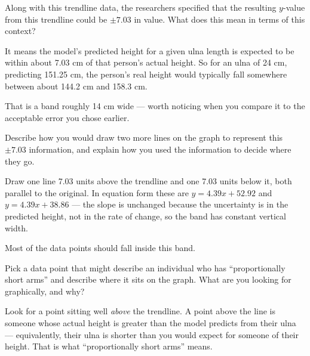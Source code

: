 \documentclass[12pt]{ximera}
\begin{document}
\begin{problem}
Along with this trendline data, the researchers specified that the resulting $y$-value
from this trendline could be $\pm 7.03$ in value. What does this mean in terms of this
context?

\begin{freeResponse}
\end{freeResponse}

\begin{solution}
It means the model's predicted height for a given ulna length is expected to be within
about 7.03 cm of that person's actual height. So for an ulna of 24 cm, predicting
151.25 cm, the person's real height would typically fall somewhere between about 144.2
cm and 158.3 cm.

That is a band roughly 14 cm wide --- worth noticing when you compare it to the
acceptable error you chose earlier.
\end{solution}
\end{problem}

\begin{problem}
Describe how you would draw two more lines on the graph to represent this $\pm 7.03$
information, and explain how you used the information to decide where they go.

\begin{freeResponse}
\end{freeResponse}

\begin{solution}
Draw one line 7.03 units above the trendline and one 7.03 units below it, both parallel
to the original. In equation form these are $y = 4.39x + 52.92$ and
$y = 4.39x + 38.86$ --- the slope is unchanged because the uncertainty is in the
predicted height, not in the rate of change, so the band has constant vertical width.

Most of the data points should fall inside this band.
\end{solution}
\end{problem}

\begin{problem}
Pick a data point that might describe an individual who has ``proportionally short
arms'' and describe where it sits on the graph. What are you looking for graphically,
and why?

\begin{freeResponse}
\end{freeResponse}

\begin{solution}
Look for a point sitting well \emph{above} the trendline. A point above the line is
someone whose actual height is greater than the model predicts from their ulna ---
equivalently, their ulna is shorter than you would expect for someone of their height.
That is what ``proportionally short arms'' means.
\end{solution}
\end{problem}
\end{document}
